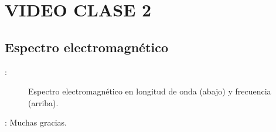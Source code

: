 \section{VIDEO CLASE 2}
\subsection{Espectro electromagnético}
\begin{frame}{\secname : \subsecname}
  \begin{figure}
    \centering
    \caption{Espectro electromagnético en longitud de onda (abajo) y frecuencia (arriba).}
    \label{}
  \end{figure}
\end{frame}


\begin{frame}{\secname : \subsecname}
Muchas gracias.
\end{frame}
